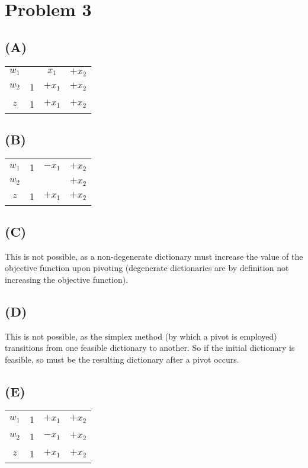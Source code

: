 \documentclass[12pt]{article}
\begin{document}
\newpage
\section*{Problem 3}
\subsection*{(A)}
\begin{tabular}{c | c c c}
    $w_1$ & & $x_1$ & $+ x_2$ \\
    $w_2$ & 1 & $+ x_1$ & $+ x_2$ \\
    \hline
    $z$ & 1 & $+ x_1$ & $+ x_2$
\end{tabular}

\subsection*{(B)}
\begin{tabular}{c | c c c}
    $w_1$ & 1 & $- x_1$ & $+ x_2$ \\
    $w_2$ & & & $+ x_2$ \\
    \hline
    $z$ & 1 & $+ x_1$ & $+ x_2$
\end{tabular}

\subsection*{(C)}
This is not possible, as a non-degenerate dictionary must increase the value of the objective function upon pivoting (degenerate dictionaries are by definition not increasing the objective function).

\subsection*{(D)}
This is not possible, as the simplex method (by which a pivot is employed) transitions from one feasible dictionary to another. So if the initial dictionary is feasible, so must be the resulting dictionary after a pivot occurs.

\subsection*{(E)}
\begin{tabular}{c | c c c}
    $w_1$ & 1 & $+ x_1$ & $+ x_2$ \\
    $w_2$ & 1 & $- x_1$ & $+ x_2$ \\
    \hline
    $z$ & 1 & $+ x_1$ & $+ x_2$
\end{tabular}
\end{document}
